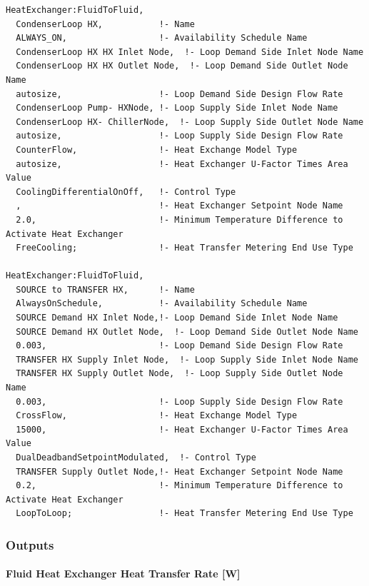 \begin{lstlisting}
HeatExchanger:FluidToFluid,
  CondenserLoop HX,           !- Name
  ALWAYS_ON,                  !- Availability Schedule Name
  CondenserLoop HX HX Inlet Node,  !- Loop Demand Side Inlet Node Name
  CondenserLoop HX HX Outlet Node,  !- Loop Demand Side Outlet Node Name
  autosize,                   !- Loop Demand Side Design Flow Rate
  CondenserLoop Pump- HXNode, !- Loop Supply Side Inlet Node Name
  CondenserLoop HX- ChillerNode,  !- Loop Supply Side Outlet Node Name
  autosize,                   !- Loop Supply Side Design Flow Rate
  CounterFlow,                !- Heat Exchange Model Type
  autosize,                   !- Heat Exchanger U-Factor Times Area Value
  CoolingDifferentialOnOff,   !- Control Type
  ,                           !- Heat Exchanger Setpoint Node Name
  2.0,                        !- Minimum Temperature Difference to Activate Heat Exchanger
  FreeCooling;                !- Heat Transfer Metering End Use Type

HeatExchanger:FluidToFluid,
  SOURCE to TRANSFER HX,      !- Name
  AlwaysOnSchedule,           !- Availability Schedule Name
  SOURCE Demand HX Inlet Node,!- Loop Demand Side Inlet Node Name
  SOURCE Demand HX Outlet Node,  !- Loop Demand Side Outlet Node Name
  0.003,                      !- Loop Demand Side Design Flow Rate
  TRANSFER HX Supply Inlet Node,  !- Loop Supply Side Inlet Node Name
  TRANSFER HX Supply Outlet Node,  !- Loop Supply Side Outlet Node Name
  0.003,                      !- Loop Supply Side Design Flow Rate
  CrossFlow,                  !- Heat Exchange Model Type
  15000,                      !- Heat Exchanger U-Factor Times Area Value
  DualDeadbandSetpointModulated,  !- Control Type
  TRANSFER Supply Outlet Node,!- Heat Exchanger Setpoint Node Name
  0.2,                        !- Minimum Temperature Difference to Activate Heat Exchanger
  LoopToLoop;                 !- Heat Transfer Metering End Use Type
\end{lstlisting}

\subsubsection{Outputs}\label{outputs-15}

\paragraph{Fluid Heat Exchanger Heat Transfer Rate {[}W{]}}\label{fluid-heat-exchanger-heat-transfer-rate-w}

